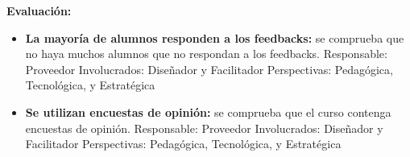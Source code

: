     \textbf{Evaluación:}
    
    \begin{itemize}
    	\item
    	\textbf{La mayoría de alumnos responden a los feedbacks:} se comprueba
    	que no haya muchos alumnos que no respondan a los feedbacks.
    	{Responsable:} Proveedor {Involucrados:} Diseñador y
    	Facilitador {Perspectivas:} Pedagógica, Tecnológica, y
    	Estratégica
    	\item
    	\textbf{Se utilizan encuestas de opinión:} se comprueba que el curso
    	contenga encuestas de opinión. {Responsable:} Proveedor
    	{Involucrados:} Diseñador y Facilitador {Perspectivas:}
    	Pedagógica, Tecnológica, y Estratégica
    \end{itemize}
    
    